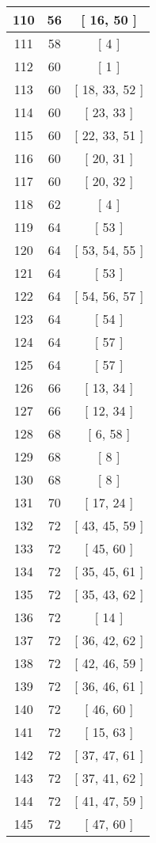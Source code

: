 \begin{center}
\begin{longtable}[H]{|| c c c ||}
\hline
110 & 56 & [ 16, 50 ] \\ 
\hline
111 & 58 & [ 4 ] \\ 
\hline
112 & 60 & [ 1 ] \\ 
\hline
113 & 60 & [ 18, 33, 52 ] \\ 
\hline
114 & 60 & [ 23, 33 ] \\ 
\hline
115 & 60 & [ 22, 33, 51 ] \\ 
\hline
116 & 60 & [ 20, 31 ] \\ 
\hline
117 & 60 & [ 20, 32 ] \\ 
\hline
118 & 62 & [ 4 ] \\ 
\hline
119 & 64 & [ 53 ] \\ 
\hline
120 & 64 & [ 53, 54, 55 ] \\ 
\hline
121 & 64 & [ 53 ] \\ 
\hline
122 & 64 & [ 54, 56, 57 ] \\ 
\hline
123 & 64 & [ 54 ] \\ 
\hline
124 & 64 & [ 57 ] \\ 
\hline
125 & 64 & [ 57 ] \\ 
\hline
126 & 66 & [ 13, 34 ] \\ 
\hline
127 & 66 & [ 12, 34 ] \\ 
\hline
128 & 68 & [ 6, 58 ] \\ 
\hline
129 & 68 & [ 8 ] \\ 
\hline
130 & 68 & [ 8 ] \\ 
\hline
131 & 70 & [ 17, 24 ] \\ 
\hline
132 & 72 & [ 43, 45, 59 ] \\ 
\hline
133 & 72 & [ 45, 60 ] \\ 
\hline
134 & 72 & [ 35, 45, 61 ] \\ 
\hline
135 & 72 & [ 35, 43, 62 ] \\ 
\hline
136 & 72 & [ 14 ] \\ 
\hline
137 & 72 & [ 36, 42, 62 ] \\ 
\hline
138 & 72 & [ 42, 46, 59 ] \\ 
\hline
139 & 72 & [ 36, 46, 61 ] \\ 
\hline
140 & 72 & [ 46, 60 ] \\ 
\hline
141 & 72 & [ 15, 63 ] \\ 
\hline
142 & 72 & [ 37, 47, 61 ] \\ 
\hline
143 & 72 & [ 37, 41, 62 ] \\ 
\hline
144 & 72 & [ 41, 47, 59 ] \\ 
\hline
145 & 72 & [ 47, 60 ] \\ 

\end{longtable}
\end{center}
